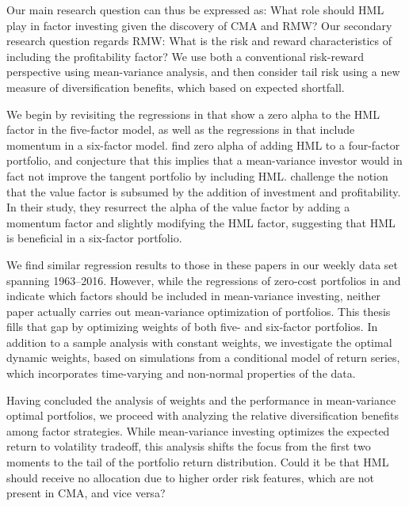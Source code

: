 Our main research question can thus be expressed as: What role should HML play in factor investing given the discovery of CMA and RMW?  Our secondary research question regards RMW: What is the risk and reward characteristics of including the profitability factor? We use both a conventional risk-reward perspective using mean-variance analysis, and then consider tail risk using a new measure of diversification benefits, which based on expected shortfall.

We begin by revisiting the regressions in \textcite{FF2015} that show a zero alpha to the HML factor in the five-factor model, as well as the regressions in \textcite{Asness2015} that include momentum in a six-factor model. \textcite{FF2015} find zero alpha of adding HML to a four-factor portfolio, and conjecture that this implies that a mean-variance investor would in fact not improve the tangent portfolio by including HML. \textcite{Asness2015} challenge the notion that the value factor is subsumed by the addition of investment and profitability. In their study, they resurrect the alpha of the value factor by adding a momentum factor and slightly modifying the HML factor, suggesting that HML is beneficial in a six-factor portfolio.

We find similar regression results to those in these papers in our weekly data set spanning 1963--2016. However, while the regressions of zero-cost portfolios in \textcite{FF2015} and \textcite{Asness2015} indicate which factors should be included in mean-variance investing, neither paper actually carries out mean-variance optimization of portfolios. This thesis fills that gap by optimizing weights of both five- and six-factor portfolios. In addition to a sample analysis with constant weights, we investigate the optimal dynamic weights, based on simulations from a conditional model of return series, which incorporates time-varying and non-normal properties of the data.

Having concluded the analysis of weights and the performance in mean-variance optimal portfolios, we proceed with analyzing the relative diversification benefits among factor strategies. While mean-variance investing optimizes the expected return to volatility tradeoff, this analysis shifts the focus from the first two moments to the tail of the portfolio return distribution. Could it be that HML should receive no allocation due to higher order risk features, which are not present in CMA, and vice versa? 

